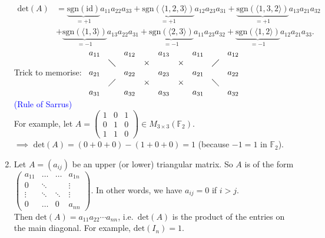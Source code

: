\documentclass[
  12pt,
  a4paper,
  twoside]{article}
\theoremstyle{plain}
\theoremstyle{definition}
\begin{document}
\begin{enumerate}
  \begin{align*}
  \mathrm{det}(A) &= \underbrace{\mathrm{sgn}(\mathrm{id})}_{= +1} a_{11}a_{22}a_{33} + \underbrace{\mathrm{sgn}( \langle 1,2,3 \rangle )}_{= +1} a_{12}a_{23}a_{31} + \underbrace{\mathrm{sgn}( \langle 1,3,2 \rangle )}_{= +1} a_{13}a_{21}a_{32} \\
  & + \underbrace{\mathrm{sgn}( \langle 1,3 \rangle )}_{= -1} a_{13}a_{22}a_{31} + \underbrace{\mathrm{sgn}( \langle 2,3 \rangle )}_{= -1} a_{11}a_{23}a_{32} + \underbrace{\mathrm{sgn}(\langle 1,2 \rangle )}_{= -1} a_{12}a_{21}a_{33}.
  \end{align*}
  Trick to memorise: \(\begin{array}{ c c c c c c c c c c} a_{11} & & a_{12} & & a_{13} & & a_{11} & & a_{12} \\ & \diagdown & & \times & & \times & & \diagup & \\ a_{21} & & a_{22} & & a_{23} & & a_{21} & & a_{22} \\ & \diagup & & \times & & \times & & \diagdown & \\ a_{31} & & a_{32} & & a_{33} & & a_{31} & & a_{32} \end{array}\)\\
  \textcolor{blue}{(Rule of Sarrus)}\\
  For example, let \(A = \begin{pmatrix} 1 & 0 & 1 \\ 0 & 1 & 0 \\ 1 & 1 & 0 \end{pmatrix} \in M_{3 \times 3}(\mathbb{F}_{2})\).\\
  \(\implies\) \(\mathrm{det}(A) = (0+0+0) - (1+0+0) = 1\) (because \(-1=1\) in \(\mathbb{F}_{2}\)).
\item
  Let \(A = (a_{ij})\) be an upper (or lower) triangular matrix. So \(A\) is of the form \(\begin{pmatrix} a_{11} & \ldots & \ldots & a_{1n} \\ 0 & \ddots & & \vdots \\ \vdots & \ddots & \ddots & \vdots \\ 0 & \ldots & 0 & a_{nn} \end{pmatrix}\). In other words, we have \(a_{ij} = 0\) if \(i > j\).\\
  Then \(\mathrm{det}(A) = a_{11} a_{22} \cdots a_{nn}\), i.e.~\(\mathrm{det}(A)\) is the product of the entries on the main diagonal. For example, \(\mathrm{det}(I_{n})= 1\).
\end{enumerate}
\end{document}
